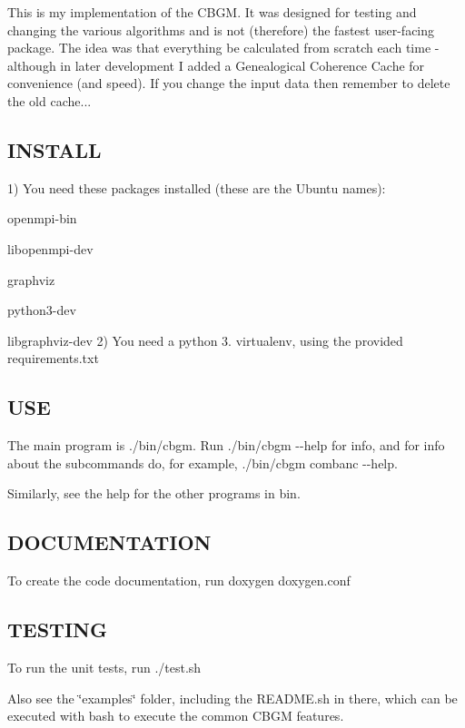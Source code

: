 This is my implementation of the C\+B\+GM. It was designed for testing and changing the various algorithms and is not (therefore) the fastest user-\/facing package. The idea was that everything be calculated from scratch each time -\/ although in later development I added a Genealogical Coherence Cache for convenience (and speed). If you change the input data then remember to delete the old cache...

\subsection*{I\+N\+S\+T\+A\+LL }

1) You need these packages installed (these are the Ubuntu names)\+:
\begin{DoxyItemize}
\item openmpi-\/bin
\item libopenmpi-\/dev
\item graphviz
\item python3-\/dev
\item libgraphviz-\/dev 2) You need a python 3. virtualenv, using the provided requirements.\+txt
\end{DoxyItemize}

\subsection*{U\+SE }

The main program is ./bin/cbgm. Run {\ttfamily ./bin/cbgm -\/-\/help} for info, and for info about the subcommands do, for example, {\ttfamily ./bin/cbgm combanc -\/-\/help}.

Similarly, see the help for the other programs in bin.

\subsection*{D\+O\+C\+U\+M\+E\+N\+T\+A\+T\+I\+ON }

To create the code documentation, run {\ttfamily doxygen doxygen.\+conf}

\subsection*{T\+E\+S\+T\+I\+NG }

To run the unit tests, run {\ttfamily ./test.sh}

Also see the \char`\"{}examples\char`\"{} folder, including the R\+E\+A\+D\+M\+E.\+sh in there, which can be executed with bash to execute the common C\+B\+GM features. 
